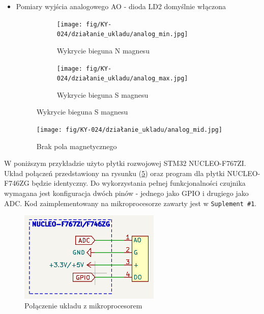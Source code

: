 \documentclass[11pt, a4paper]{article}
\begin{document}
\begin{itemize}
\item{Pomiary wyjścia analogowego AO - dioda LD2 domyślnie włączona}
\begin{figure}[h]
\centering
\begin{subfigure}{.5\textwidth}
\centering
\texttt{[image: fig/KY-024/działanie\_ukladu/analog\_min.jpg]}
\caption{Wykrycie bieguna N magnesu}
\label{fig:_analog_min_def_on}
\end{subfigure}%
\begin{subfigure}{.5\textwidth}
\centering
\texttt{[image: fig/KY-024/działanie\_ukladu/analog\_max.jpg]}
\caption{Wykrycie bieguna S magnesu}
\label{fig:_analog_max_def_on}
\end{subfigure}
\label{fig:miernik3}
\end{figure}

\begin{figure}[H]
    \centering
    \texttt{[image: fig/KY-024/działanie\_ukladu/analog\_mid.jpg]}
    \caption{Brak pola magnetycznego}
    \label{fig:_analog_mid_def_on}
\end{figure}
\end{itemize}

\newpage

W poniższym przykładzie użyto płytki rozwojowej STM32 NUCLEO-F767ZI. Układ połączeń przedstawiony na rysunku (\ref{fig:_polaczenie_ukladu}) oraz program dla płytki NUCLEO-F746ZG będzie identyczny. Do wykorzystania pełnej funkcjonalności czujnika wymagana jest konfiguracja dwóch pinów - jednego jako GPIO i drugiego jako ADC. Kod zaimplementowany na mikroprocesorze zawarty jest w \texttt{Suplement \#1}.
\vspace{0.25cm}
\begin{figure}[H]
    \centering
    \includegraphics[width=0.6\textwidth]{fig/KY-024/polaczenie_modulu/polaczenie_nucleo.png}
    \caption{Połączenie układu z mikroprocesorem}
    \label{fig:_polaczenie_ukladu}
\end{figure}
\vspace{0.25cm}
\end{document}
